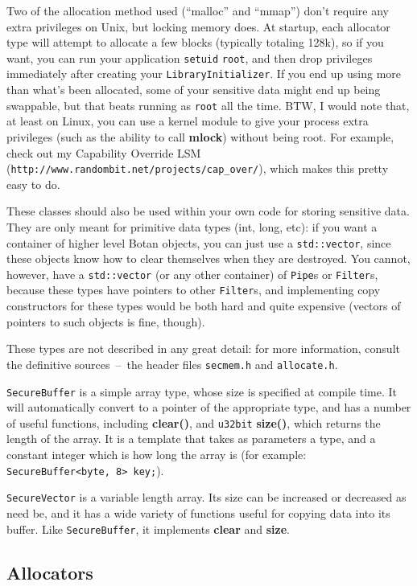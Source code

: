 \documentclass{article}
\newcommand{\filename}[1]{\texttt{#1}}
\newcommand{\function}[1]{\textbf{#1}}
\newcommand{\type}[1]{\texttt{#1}}
\newcommand{\url}[1]{\texttt{#1}}
\begin{document}
Two of the allocation method used (``malloc'' and ``mmap'') don't
require any extra privileges on Unix, but locking memory does. At
startup, each allocator type will attempt to allocate a few blocks
(typically totaling 128k), so if you want, you can run your
application \texttt{setuid} \texttt{root}, and then drop privileges
immediately after creating your \type{LibraryInitializer}. If you end
up using more than what's been allocated, some of your sensitive data
might end up being swappable, but that beats running as \texttt{root}
all the time. BTW, I would note that, at least on Linux, you can use a
kernel module to give your process extra privileges (such as the
ability to call \function{mlock}) without being root. For example,
check out my Capability Override LSM
(\url{http://www.randombit.net/projects/cap\_over/}), which makes this
pretty easy to do.

These classes should also be used within your own code for storing sensitive
data. They are only meant for primitive data types (int, long, etc): if you
want a container of higher level Botan objects, you can just use a
\verb|std::vector|, since these objects know how to clear themselves when they
are destroyed. You cannot, however, have a \verb|std::vector| (or any other
container) of \type{Pipe}s or \type{Filter}s, because these types have pointers
to other \type{Filter}s, and implementing copy constructors for these types
would be both hard and quite expensive (vectors of pointers to such objects is
fine, though).

These types are not described in any great detail: for more information,
consult the definitive sources~--~the header files \filename{secmem.h} and
\filename{allocate.h}.

\type{SecureBuffer} is a simple array type, whose size is specified at compile
time. It will automatically convert to a pointer of the appropriate type, and
has a number of useful functions, including \function{clear()}, and
\type{u32bit} \function{size()}, which returns the length of the array. It is a
template that takes as parameters a type, and a constant integer which is how
long the array is (for example: \verb|SecureBuffer<byte, 8> key;|).

\type{SecureVector} is a variable length array. Its size can be increased or
decreased as need be, and it has a wide variety of functions useful for copying
data into its buffer. Like \type{SecureBuffer}, it implements \function{clear}
and \function{size}.

\subsection{Allocators}
\end{document}
